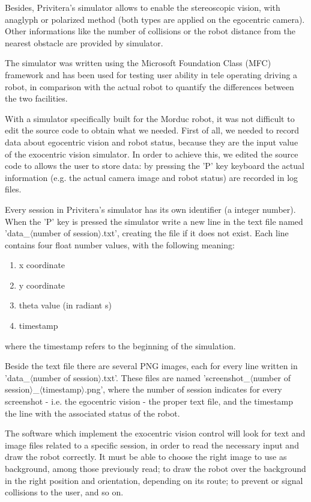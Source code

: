 %
Besides, Privitera's simulator allows to enable the 
stereoscopic vision, with anaglyph or polarized method (both 
types are applied on the egocentric camera). Other informations 
like the number of collisions or the robot distance from the 
nearest obstacle are provided by simulator.
%

%
The simulator was written using the Microsoft Foundation Class
(MFC) framework and has been used for testing user ability in
tele operating driving a robot, in comparison with the actual 
robot to quantify the differences between the two facilities. 
%

%
With a simulator specifically built for the Morduc robot, it 
was not difficult to edit the source code to obtain what we 
needed. First of all, we needed to record data about egocentric 
vision and robot status, because they are the input value 
of the exocentric vision simulator. In order to achieve this, 
we edited the source code to allows the user to store data: by 
pressing the 'P' key keyboard the actual information (e.g. the 
actual camera image and robot status) are recorded in log files.
%

%
Every session in Privitera's simulator has its own identifier 
(a integer number). When the 'P' key is pressed the simulator 
write a new line in the text file named 'data\_$\langle$number 
of session$\rangle$.txt', creating the file if it does not 
exist. Each line contains four float number values, with the 
following meaning:
%
\begin{enumerate}
\item x coordinate
\item y coordinate
\item theta value (in radiant s)
\item timestamp
\end{enumerate}
%
where the timestamp refers to the beginning of the simulation.
%

%
Beside the text file there are several PNG images, each for every 
line written in 'data\_$\langle$number of session$\rangle$.txt'. 
These files are named 'screenshot\_$\langle$number of 
session$\rangle$\_$\langle$timestamp$\rangle$.png', where the 
number of session indicates for every screenshot 
- i.e. the egocentric vision - the proper text file, and the 
timestamp the line with the associated status of the robot.
%

%
The software which implement the exocentric vision control 
will look for text and image files related to a specific 
session, in order to read the necessary input and draw the 
robot correctly. It must be able to choose the right image 
to use as background, among those previously read; to draw 
the robot over the background in the right position and 
orientation, depending on its route; to prevent or signal 
collisions to the user, and so on.
%
